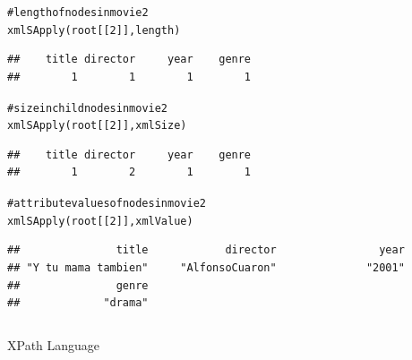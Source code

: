 \documentclass{beamer}\usepackage[]{graphicx}\usepackage[]{color}
\makeatletter
\newcommand{\hlnum}[1]{\textcolor[rgb]{0.063,0.58,0.627}{#1}}%
\newcommand{\hlcom}[1]{\textcolor[rgb]{0.588,0.588,0.588}{#1}}%
\newcommand{\hlstd}[1]{\textcolor[rgb]{0.196,0.196,0.196}{#1}}%
\newcommand{\hlkwd}[1]{\textcolor[rgb]{0.78,0.227,0.412}{#1}}%
\newenvironment{kframe}{%
 \def\at@end@of@kframe{}%
 \ifinner\ifhmode%
  \def\at@end@of@kframe{\end{minipage}}%
  \begin{minipage}{\columnwidth}%
 \fi\fi%
 \def\FrameCommand##1{\hskip\@totalleftmargin \hskip-\fboxsep
 \colorbox{shadecolor}{##1}\hskip-\fboxsep
     \hskip-\linewidth \hskip-\@totalleftmargin \hskip\columnwidth}%
 \MakeFramed {\advance\hsize-\width
   \@totalleftmargin\z@ \linewidth\hsize
   \@setminipage}}%
 {\par\unskip\endMakeFramed%
 \at@end@of@kframe}
\newenvironment{knitrout}{}{} %
\makeatother
\begin{document}
\begin{frame}[fragile]
\begin{columns}[t]
\begin{column}{0.5\textwidth}
\begin{knitrout}\tiny
{}\color{fgcolor}\begin{kframe}
\begin{alltt}
\hlcom{# length of nodes in movie 2}
\hlkwd{xmlSApply}\hlstd{(root[[}\hlnum{2}\hlstd{]], length)}
\end{alltt}
\begin{verbatim}
##    title director     year    genre 
##        1        1        1        1
\end{verbatim}
\begin{alltt}
\hlcom{# size in child nodes in movie 2}
\hlkwd{xmlSApply}\hlstd{(root[[}\hlnum{2}\hlstd{]], xmlSize)}
\end{alltt}
\begin{verbatim}
##    title director     year    genre 
##        1        2        1        1
\end{verbatim}
\begin{alltt}
\hlcom{# attribute values of nodes in movie 2}
\hlkwd{xmlSApply}\hlstd{(root[[}\hlnum{2}\hlstd{]], xmlValue)}
\end{alltt}
\begin{verbatim}
##               title            director                year 
## "Y tu mama tambien"     "AlfonsoCuaron"              "2001" 
##               genre 
##             "drama"
\end{verbatim}
\end{kframe}
\end{knitrout}
\end{column}
\end{columns}

\end{frame}


\begin{frame}
 \begin{center}
  {\Huge \textcolor{mandarina}{XPath Language}}
 \end{center}
\end{frame}

\end{document}
